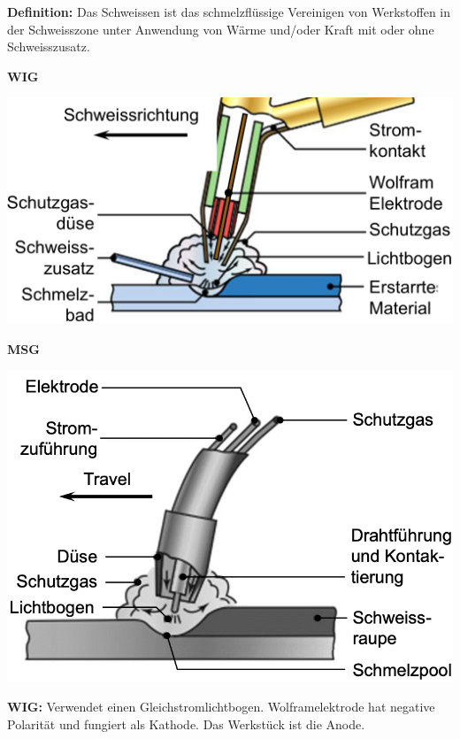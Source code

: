\textbf{Definition:} Das Schweissen ist das schmelzflüssige Vereinigen 
von Werkstoffen in der Schweisszone unter Anwendung von Wärme 
und/oder Kraft mit oder ohne Schweisszusatz.\\

\begin{minipage}{0.5\linewidth}
    \begin{center}
        \textbf{WIG}
    \end{center}
    \includegraphics[width=\linewidth]{src/images/WIG.jpeg}\\
\end{minipage}
\begin{minipage}{0.5\linewidth}
    \begin{center}
        \textbf{MSG}
    \end{center}
    \includegraphics[width=\linewidth]{src/images/MSG.png}\\
\end{minipage}
\textbf{WIG:} Verwendet einen Gleichstromlichtbogen. 
Wolframelektrode hat negative Polarität und fungiert als Kathode. 
Das Werkstück ist die Anode. \\

